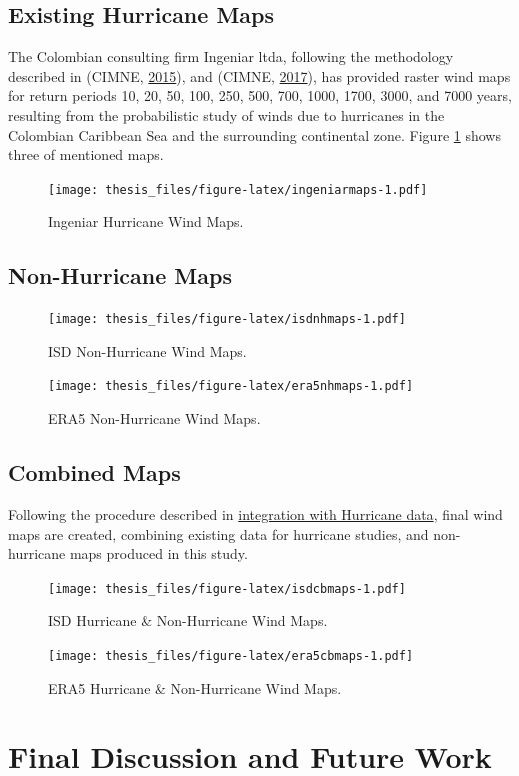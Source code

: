 \documentclass[12pt,oneside]{reedthesis}
\begin{document}
\hypertarget{existing-hurricane-maps}{%
\subsection{Existing Hurricane Maps}\label{existing-hurricane-maps}}

The Colombian consulting firm Ingeniar ltda, following the methodology described in (CIMNE, \protect\hyperlink{ref-hurricanemaps}{2015}), and (CIMNE, \protect\hyperlink{ref-hurricanemaps2}{2017}), has provided raster wind maps for return periods 10, 20, 50, 100, 250, 500, 700, 1000, 1700, 3000, and 7000 years, resulting from the probabilistic study of winds due to hurricanes in the Colombian Caribbean Sea and the surrounding continental zone. Figure \ref{fig:ingeniarmaps} shows three of mentioned maps.
\begin{figure}
\centering
\texttt{[image: thesis\_files/figure-latex/ingeniarmaps-1.pdf]}
\caption{\label{fig:ingeniarmaps}Ingeniar Hurricane Wind Maps.}
\end{figure}
\hypertarget{non-hurricane-maps}{%
\subsection{Non-Hurricane Maps}\label{non-hurricane-maps}}
\begin{figure}
\centering
\texttt{[image: thesis\_files/figure-latex/isdnhmaps-1.pdf]}
\caption{\label{fig:isdnhmaps}ISD Non-Hurricane Wind Maps.}
\end{figure}
\begin{figure}
\centering
\texttt{[image: thesis\_files/figure-latex/era5nhmaps-1.pdf]}
\caption{\label{fig:era5nhmaps}ERA5 Non-Hurricane Wind Maps.}
\end{figure}
\hypertarget{cm}{%
\subsection{Combined Maps}\label{cm}}

Following the procedure described in \protect\hyperlink{integration}{integration with Hurricane data}, final wind maps are created, combining existing data for hurricane studies, and non-hurricane maps produced in this study.
\begin{figure}
\centering
\texttt{[image: thesis\_files/figure-latex/isdcbmaps-1.pdf]}
\caption{\label{fig:isdcbmaps}ISD Hurricane \& Non-Hurricane Wind Maps.}
\end{figure}
\begin{figure}
\centering
\texttt{[image: thesis\_files/figure-latex/era5cbmaps-1.pdf]}
\caption{\label{fig:era5cbmaps}ERA5 Hurricane \& Non-Hurricane Wind Maps.}
\end{figure}
\hypertarget{fd}{%
\section{Final Discussion and Future Work}\label{fd}}
\end{document}
